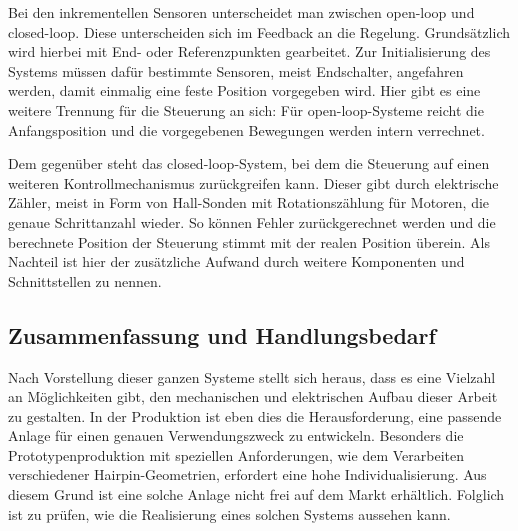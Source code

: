 Bei den inkrementellen Sensoren unterscheidet man zwischen open-loop und closed-loop. Diese unterscheiden sich im Feedback an die Regelung.
Grundsätzlich wird hierbei mit End- oder Referenzpunkten gearbeitet. Zur Initialisierung des Systems müssen dafür bestimmte Sensoren,
meist Endschalter, angefahren werden, damit einmalig eine feste Position vorgegeben wird. Hier gibt es eine weitere Trennung für die
Steuerung an sich: Für open-loop-Systeme reicht die Anfangsposition und die vorgegebenen Bewegungen werden intern verrechnet.

Dem gegenüber steht das closed-loop-System, bei dem die Steuerung auf einen weiteren Kontrollmechanismus zurückgreifen kann. Dieser
gibt durch elektrische Zähler, meist in Form von Hall-Sonden mit Rotationszählung für Motoren,
die genaue Schrittanzahl wieder. So können Fehler zurückgerechnet werden und die berechnete Position der Steuerung stimmt mit
der realen Position überein. Als Nachteil ist hier der zusätzliche Aufwand durch weitere Komponenten und Schnittstellen zu nennen.
%
%
\subsection{Zusammenfassung und Handlungsbedarf}\label{sec:ResearchGap}
Nach Vorstellung dieser ganzen Systeme stellt sich heraus, dass es eine Vielzahl an Möglichkeiten gibt, den mechanischen und elektrischen
Aufbau dieser Arbeit zu gestalten. In der Produktion ist eben dies die Herausforderung, eine passende Anlage für einen genauen Verwendungszweck
zu entwickeln. Besonders die Prototypenproduktion mit speziellen Anforderungen, wie dem Verarbeiten verschiedener Hairpin-Geometrien, erfordert
eine hohe Individualisierung. Aus diesem Grund ist eine solche Anlage nicht frei auf dem Markt erhältlich.
Folglich ist zu prüfen, wie die Realisierung eines solchen Systems aussehen kann.
